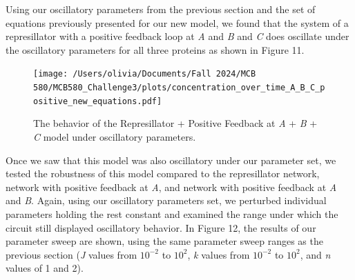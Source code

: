 \documentclass{article}
\begin{document}
Using our oscillatory parameters from the previous section and the set of equations previously presented for our new model, we found that the system of a represillator with a positive feedback loop at \textit{A} and \textit{B} and \textit{C} does oscillate under the oscillatory parameters for all three proteins as shown in Figure 11. 

\begin{figure}[H]
    \centering
    \texttt{[image: /Users/olivia/Documents/Fall 2024/MCB 580/MCB580\_Challenge3/plots/concentration\_over\_time\_A\_B\_C\_positive\_new\_equations.pdf]}
    \caption{The behavior of the Represillator + Positive Feedback at \textit{A} + \textit{B} + \textit{C} model under oscillatory parameters.}
    \label{fig:11}
\end{figure}



Once we saw that this model was also oscillatory under our parameter set, we tested the robustness of this model compared to the represillator network, network with positive feedback at \textit{A}, and network with positive feedback at \textit{A} and \textit{B}. Again, using our oscillatory parameters set, we perturbed individual parameters holding the rest constant and examined the range under which the circuit still displayed oscillatory behavior. In Figure 12, the results of our parameter sweep are shown, using the same parameter sweep ranges as the previous section (\textit{J} values from \( 10^{-2} \) to \( 10^{2} \), \textit{k} values from \( 10^{-2} \) to \( 10^{2} \), and \textit{n} values of 1 and 2). 

\end{document}
